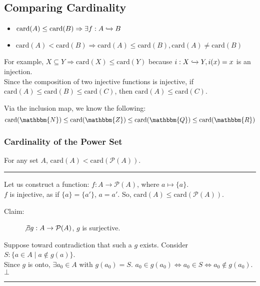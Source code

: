 \documentclass[10pt]{extarticle}
\begin{document}
    \subsection{Comparing Cardinality}%
    \begin{itemize}
      \item $\text{card}(A) \leq \text{card}(B) \Rightarrow \exists f: A\xhookrightarrow{} B$ 
      \item $\text{card}(A) < \text{card}(B) \Rightarrow \text{card}(A) \leq \text{card}(B), \text{card}(A) \neq \text{card}(B)$
    \end{itemize}
    For example, $X\subseteq Y \Rightarrow \text{card}(X) \leq \text{card}(Y)$ because $i: X\xhookrightarrow{} Y, i(x) = x$ is an injection.\\

    Since the composition of two injective functions is injective, if $\text{card}(A) \leq \text{card}(B) \leq \text{card}(C)$, then $\text{card}(A) \leq \text{card}(C)$.

      Via the inclusion map, we know the following:
      \[
        \text{card}(\mathbbm{N}) \leq \text{card}(\mathbbm{Z}) \leq \text{card}(\mathbbm{Q}) \leq \text{card}(\mathbbm{R})
      \] 
      \subsubsection{Cardinality of the Power Set}%
      For any set $A$, $\text{card}(A) < \text{card}(\mathcal{P}(A))$.\\
      \vspace{4pt}
      \rule{\textwidth}{0.4pt}
      \vspace{4pt}
      Let us construct a function: $f: A \rightarrow \mathcal{P}(A)$, where $a \mapsto \{a\}$.\\

      $f$ is injective, as if $\{a\} = \{a'\}$, $a = a'$. So, $\text{card}(A) \leq \text{card}(\mathcal{P}(A))$.
      \begin{description}
        \item[Claim:] $\not\exists g: A\rightarrow \mathcal{P}(A)$, $g$ is surjective.
      \end{description}
      Suppose toward contradiction that such a $g$ exists. Consider $S: \{a\in A \mid a\notin g(a)\}$.\\

      Since $g$ is onto, $\exists a_0\in A$ with $g(a_0) = S$. $a_0 \in g(a_0) \Leftrightarrow a_0\in S \Leftrightarrow a_0\notin g(a_0)$. $\bot$\\
      \vspace{4pt}
      \rule{\textwidth}{0.4pt}
\end{document}
